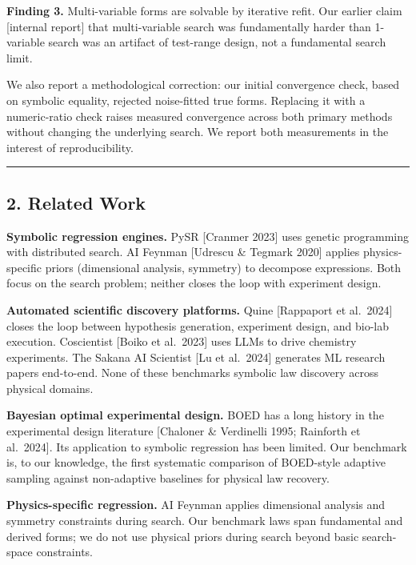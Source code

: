 \documentclass[
]{article}
\begin{document}
\textbf{Finding 3.} Multi-variable forms are solvable by iterative
refit. Our earlier claim {[}internal report{]} that multi-variable
search was fundamentally harder than 1-variable search was an artifact
of test-range design, not a fundamental search limit.

We also report a methodological correction: our initial convergence
check, based on symbolic equality, rejected noise-fitted true forms.
Replacing it with a numeric-ratio check raises measured convergence
across both primary methods without changing the underlying search. We
report both measurements in the interest of reproducibility.

\begin{center}\rule{0.5\linewidth}{0.5pt}\end{center}

\subsection{2. Related Work}\label{related-work}

\textbf{Symbolic regression engines.} PySR {[}Cranmer 2023{]} uses
genetic programming with distributed search. AI Feynman {[}Udrescu \&
Tegmark 2020{]} applies physics-specific priors (dimensional analysis,
symmetry) to decompose expressions. Both focus on the search problem;
neither closes the loop with experiment design.

\textbf{Automated scientific discovery platforms.} Quine {[}Rappaport et
al.~2024{]} closes the loop between hypothesis generation, experiment
design, and bio-lab execution. Coscientist {[}Boiko et al.~2023{]} uses
LLMs to drive chemistry experiments. The Sakana AI Scientist {[}Lu et
al.~2024{]} generates ML research papers end-to-end. None of these
benchmarks symbolic law discovery across physical domains.

\textbf{Bayesian optimal experimental design.} BOED has a long history
in the experimental design literature {[}Chaloner \& Verdinelli 1995;
Rainforth et al.~2024{]}. Its application to symbolic regression has
been limited. Our benchmark is, to our knowledge, the first systematic
comparison of BOED-style adaptive sampling against non-adaptive
baselines for physical law recovery.

\textbf{Physics-specific regression.} AI Feynman applies dimensional
analysis and symmetry constraints during search. Our benchmark laws span
fundamental and derived forms; we do not use physical priors during
search beyond basic search-space constraints.
\end{document}
